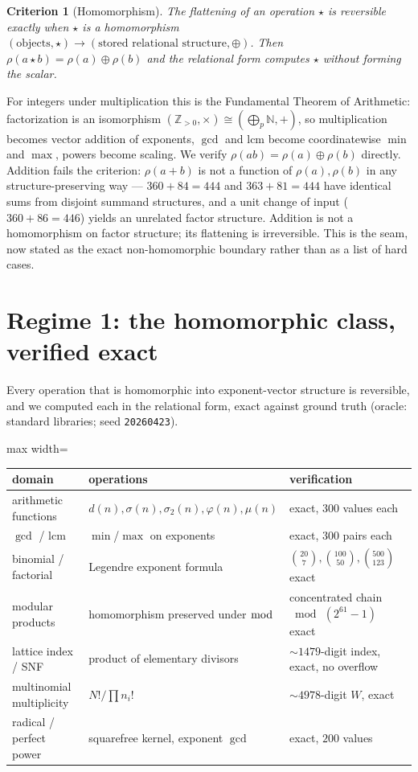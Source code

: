 \documentclass[11pt]{article}
\newtheorem{criterion}{Criterion}\newtheorem{definition}{Definition}
\begin{document}
\begin{criterion}[Homomorphism]
The flattening of an operation $\star$ is reversible exactly when $\star$ is a homomorphism
$(\text{objects},\star)\to(\text{stored relational structure},\oplus)$. Then $\rho(a\star b)=\rho(a)\oplus
\rho(b)$ and the relational form computes $\star$ without forming the scalar.
\end{criterion}

For integers under multiplication this is the Fundamental Theorem of Arithmetic: factorization is an
isomorphism $(\mathbb{Z}_{>0},\times)\cong(\bigoplus_p\mathbb{N},+)$, so multiplication becomes vector
addition of exponents, $\gcd$ and $\mathrm{lcm}$ become coordinatewise $\min$ and $\max$, powers become
scaling. We verify $\rho(ab)=\rho(a)\oplus\rho(b)$ directly. Addition fails the criterion: $\rho(a+b)$ is not
a function of $\rho(a),\rho(b)$ in any structure-preserving way --- $360+84=444$ and $363+81=444$ have
identical sums from disjoint summand structures, and a unit change of input ($360+86=446$) yields an
unrelated factor structure. Addition is not a homomorphism on factor structure; its flattening is
irreversible. This is the seam, now stated as the exact non-homomorphic boundary rather than as a list of
hard cases.

\section{Regime 1: the homomorphic class, verified exact}

Every operation that is homomorphic into exponent-vector structure is reversible, and we computed each in the
relational form, exact against ground truth (oracle: standard libraries; seed \texttt{20260423}).

\begin{center}
\begin{adjustbox}{max width=\linewidth}\begin{tabular}{lll}
\toprule
domain & operations & verification \\
\midrule
arithmetic functions & $d(n),\sigma(n),\sigma_2(n),\varphi(n),\mu(n)$ & exact, $300$ values each \\
$\gcd$ / $\mathrm{lcm}$ & $\min$/$\max$ on exponents & exact, $300$ pairs each \\
binomial / factorial & Legendre exponent formula & $\binom{20}{7},\binom{100}{50},\binom{500}{123}$ exact \\
modular products & homomorphism preserved under $\bmod$ & concentrated chain $\bmod\,(2^{61}{-}1)$ exact \\
lattice index / SNF & product of elementary divisors & $\sim\!1479$-digit index, exact, no overflow \\
multinomial multiplicity & $N!/\prod n_i!$ & $\sim\!4978$-digit $W$, exact \\
radical / perfect power & squarefree kernel, exponent $\gcd$ & exact, $200$ values \\
\bottomrule
\end{tabular}\end{adjustbox}
\end{center}
\end{document}
